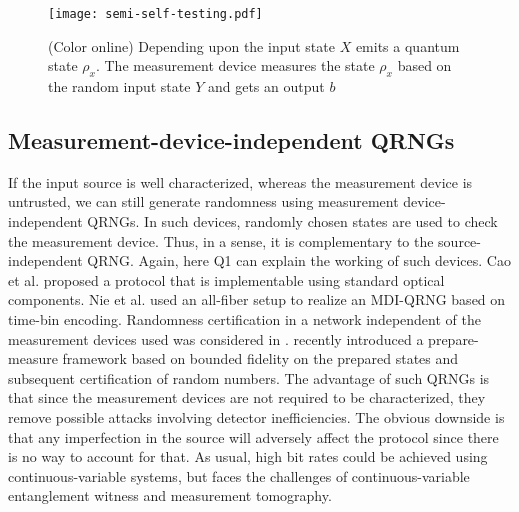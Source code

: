 \documentclass[]{interact}
\theoremstyle{plain}%
\theoremstyle{definition}
\theoremstyle{remark}
\begin{document}
\begin{figure}
    \centering
    \texttt{[image: semi-self-testing.pdf]}
    \caption{(Color online) Depending upon the input state $X$ emits a quantum state $\rho_x$. The measurement device measures the state $\rho_x$ based on the random input state $Y$ and gets an output $b$ \cite{ma2016quantum}}
    \label{semi}
\end{figure}

 \subsection{Measurement-device-independent QRNGs}
 If the input source is well characterized, whereas the measurement device is untrusted, we can still generate randomness using measurement device-independent QRNGs. In such devices, randomly chosen states are used to check the measurement device. Thus, in a sense, it is complementary to the source-independent QRNG. Again, here Q1 can explain the working of such devices. Cao et al. \cite{Cao_2015} proposed a protocol that is implementable using standard optical components. Nie et al. \cite{PhysRevA.94.060301} used an all-fiber setup to realize an MDI-QRNG based on time-bin encoding. Randomness certification in a network independent of the measurement devices used was considered in \cite{PhysRevA.95.042340}. \cite{Tavakoli2021May} recently introduced a prepare-measure framework based on bounded fidelity on the prepared states and subsequent certification of random numbers. The advantage of such QRNGs is that since the measurement devices are not required to be characterized, they remove possible attacks involving detector inefficiencies. The obvious downside is that any imperfection in the source will adversely affect the protocol since there is no way to account for that. As usual, high bit rates could be achieved using continuous-variable systems, but faces the challenges of continuous-variable entanglement witness and measurement
tomography.
\end{document}
